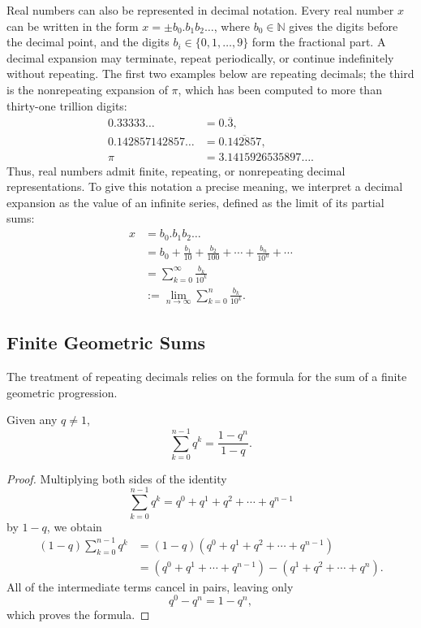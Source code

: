 Real numbers can also be represented in decimal notation. Every real number $x$ can be written in the form $x = \pm b_0.b_1 b_2 \ldots$, where $b_0 \in \mathbb{N}$ gives the digits before the decimal point, and the digits $b_i \in \{0, 1, \dots, 9\}$ form the fractional part.
A decimal expansion may terminate, repeat periodically, or continue indefinitely without repeating. The first two examples below are repeating decimals; the third is the nonrepeating expansion of $\pi$, which has been computed to more than thirty-one trillion digits:
\[
\begin{aligned}
0.33333\ldots &= 0.\overline{3}, \\
0.142857142857\ldots &= 0.\overline{142857}, \\
\pi &= 3.1415926535897\ldots.
\end{aligned}
\]
Thus, real numbers admit finite, repeating, or nonrepeating decimal representations. To give this notation a precise meaning, we interpret a decimal expansion as the value of an infinite series, defined as the limit of its partial sums:
\[
\begin{aligned}
x &= b_0.b_1 b_2 \ldots \\
&= b_0 + \frac{b_1}{10} + \frac{b_2}{100} + \cdots + \frac{b_n}{10^n} + \cdots \\
&= \sum_{k=0}^{\infty} \frac{b_k}{10^k} \\
&:= \lim_{n \to \infty} \sum_{k=0}^{n} \frac{b_k}{10^k}.
\end{aligned}
\]

\subsection{Finite Geometric Sums}

The treatment of repeating decimals relies on the formula for the sum of a finite geometric progression.

\begin{theorem}
Given any $q \neq 1$,
\[
\sum_{k=0}^{n-1} q^k = \frac{1 - q^n}{1-q}.
\]

\end{theorem}

\begin{proof}
Multiplying both sides of the identity \[
\sum_{k=0}^{n-1} q^k = q^0 + q^1 + q^2 + \cdots + q^{n-1}
\] by $1-q$, we obtain
\[
\begin{aligned}
(1-q) \sum_{k=0}^{n-1} q^k &= (1-q)(q^0 + q^1 + q^2 + \cdots + q^{n-1}) \\
&= (q^0 + q^1 + \cdots + q^{n-1}) - (q^1 + q^2 + \cdots + q^n).
\end{aligned}
\]
All of the intermediate terms cancel in pairs, leaving only
\[
q^0 - q^n = 1 - q^n,
\]
which proves the formula.
\end{proof}

